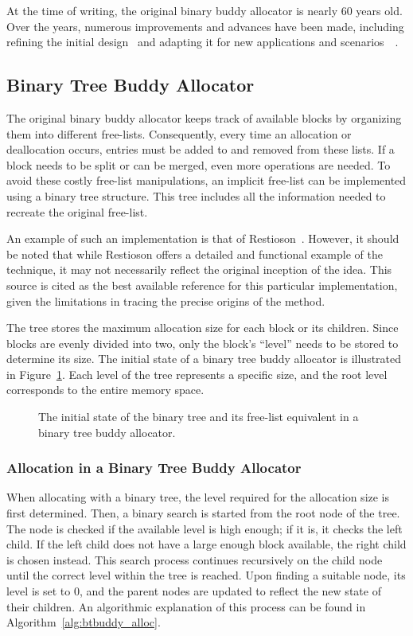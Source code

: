 At the time of writing, the original binary buddy allocator is nearly 60 years old. Over the years, numerous improvements and advances have been made, including refining the initial design~\cite{genbuddy} and adapting it for new applications and scenarios~\cite{nbbs}~\cite{park2014ibuddy}.

\subsection{Binary Tree Buddy Allocator}
The original binary buddy allocator keeps track of available blocks by organizing them into different free-lists. Consequently, every time an allocation or deallocation occurs, entries must be added to and removed from these lists. If a block needs to be split or can be merged, even more operations are needed. To avoid these costly free-list manipulations, an implicit free-list can be implemented using a binary tree structure. This tree includes all the information needed to recreate the original free-list.

An example of such an implementation is that of Restioson~\cite{btbuddy}. However, it should be noted that while Restioson offers a detailed and functional example of the technique, it may not necessarily reflect the original inception of the idea. This source is cited as the best available reference for this particular implementation, given the limitations in tracing the precise origins of the method.

The tree stores the maximum allocation size for each block or its children. Since blocks are evenly divided into two, only the block's ``level'' needs to be stored to determine its size. The initial state of a binary tree buddy allocator is illustrated in Figure~\ref{fig:btbuddyinitial}. Each level of the tree represents a specific size, and the root level corresponds to the entire memory space.

\begin{figure}[h]
    \centering
    
    \caption{The initial state of the binary tree and its free-list equivalent in a binary tree buddy allocator.}
    \label{fig:btbuddyinitial}
\end{figure}

\subsubsection{Allocation in a Binary Tree Buddy Allocator}
When allocating with a binary tree, the level required for the allocation size is first determined. Then, a binary search is started from the root node of the tree. The node is checked if the available level is high enough; if it is, it checks the left child. If the left child does not have a large enough block available, the right child is chosen instead. This search process continues recursively on the child node until the correct level within the tree is reached. Upon finding a suitable node, its level is set to 0, and the parent nodes are updated to reflect the new state of their children. An algorithmic explanation of this process can be found in Algorithm~\ref{alg:btbuddy_alloc}.

